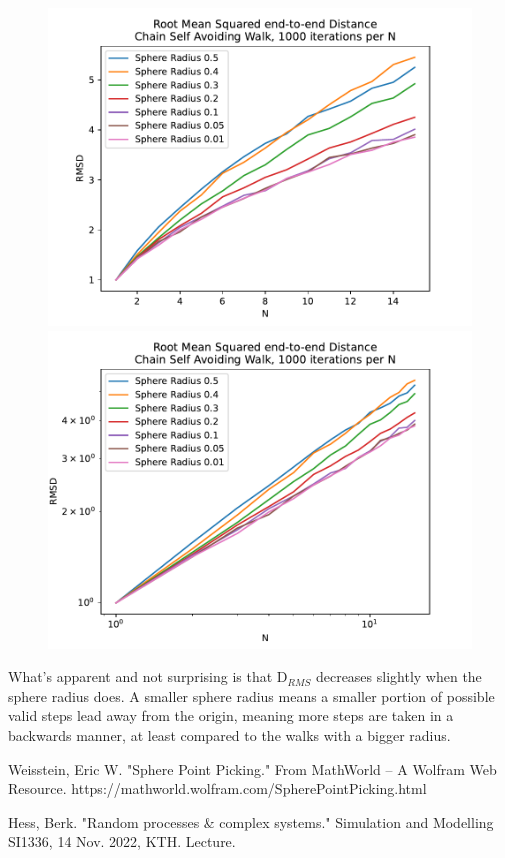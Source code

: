 \documentclass[a4paper,12pt]{article}
\begin{document}
\begin{figure}[!ht]
  \centering
  \begin{minipage}{0.49\textwidth}
    \includegraphics[width=\textwidth]{img/4-rmsd-radius-comparison.pdf}
  \end{minipage}
  \begin{minipage}{0.49\textwidth}
    \includegraphics[width=\textwidth]{img/4-rmsd-radius-comparison-loglog.pdf}
  \end{minipage}
\end{figure}

What's apparent and not surprising is that $\mathrm{D}_{RMS}$ decreases slightly when the sphere radius does.
A smaller sphere radius means a smaller portion of possible valid steps lead away from the origin, meaning more
steps are taken in a backwards manner, at least compared to the walks with a bigger radius.

\begin{thebibliography}{9}
   Weisstein, Eric W. "Sphere Point Picking." From MathWorld -- A Wolfram Web Resource.
  https://mathworld.wolfram.com/SpherePointPicking.html

   Hess, Berk. "Random processes \& complex systems." Simulation and Modelling SI1336, 14 Nov. 2022,
  KTH. Lecture.
\end{thebibliography}
\end{document}
